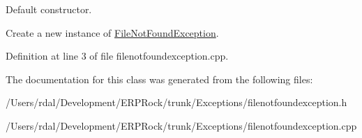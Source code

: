 \-Default constructor. 

\-Create a new instance of \hyperlink{class_file_not_found_exception}{\-File\-Not\-Found\-Exception}. 

\-Definition at line 3 of file filenotfoundexception.\-cpp.



\-The documentation for this class was generated from the following files\-:\begin{DoxyCompactItemize}
\item 
/\-Users/rdal/\-Development/\-E\-R\-P\-Rock/trunk/\-Exceptions/filenotfoundexception.\-h\item 
/\-Users/rdal/\-Development/\-E\-R\-P\-Rock/trunk/\-Exceptions/filenotfoundexception.\-cpp\end{DoxyCompactItemize}
